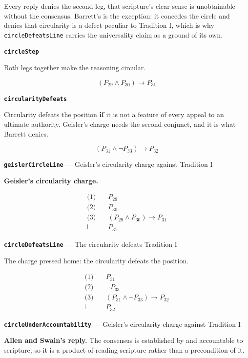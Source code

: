 \documentclass[11pt]{article}
\begin{document}
Every reply denies the second leg, that scripture's clear sense is unobtainable without the consensus. Barrett's is the exception: it concedes the circle and denies that circularity is a defect peculiar to Tradition I, which is why \texttt{circle\allowbreak{}Defeats\allowbreak{}Line} carries the universality claim as a ground of its own.

\par\medskip\noindent\textbf{\texttt{circle\allowbreak{}Step}}\par\nobreak\noindent
Both legs together make the reasoning circular.

\[(P_{29} \land P_{30}) \rightarrow P_{31}\]
\par\medskip\noindent\textbf{\texttt{circularity\allowbreak{}Defeats}}\par\nobreak\noindent
Circularity defeats the position \textbf{if} it is not a feature of every appeal to an ultimate authority. Geisler's charge needs the second conjunct, and it is what Barrett denies.

\[(P_{31} \land \lnot P_{33}) \rightarrow P_{32}\]
\par\medskip\noindent\textbf{\texttt{geisler\allowbreak{}Circle\allowbreak{}Line}} --- Geisler's circularity charge against Tradition I\par\nobreak\noindent
\textbf{Geisler's circularity charge.}

\begin{align*}
  \text{(1)} \quad & P_{29} \\
  \text{(2)} \quad & P_{30} \\
  \text{(3)} \quad & (P_{29} \land P_{30}) \rightarrow P_{31} \\
  \vdash \quad & P_{31}
\end{align*}
\par\medskip\noindent\textbf{\texttt{circle\allowbreak{}Defeats\allowbreak{}Line}} --- The circularity defeats Tradition I\par\nobreak\noindent
The charge pressed home: the circularity defeats the position.

\begin{align*}
  \text{(1)} \quad & P_{31} \\
  \text{(2)} \quad & \lnot P_{33} \\
  \text{(3)} \quad & (P_{31} \land \lnot P_{33}) \rightarrow P_{32} \\
  \vdash \quad & P_{32}
\end{align*}
\par\medskip\noindent\textbf{\texttt{circle\allowbreak{}Under\allowbreak{}Accountability}} --- Geisler's circularity charge against Tradition I\par\nobreak\noindent
\textbf{Allen and Swain's reply.} The consensus is established by and accountable to scripture, so it is a product of reading scripture rather than a precondition of it.
\end{document}
